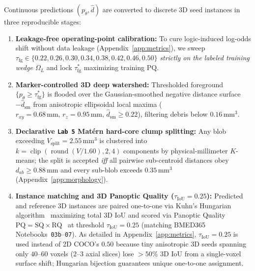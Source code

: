 \documentclass[10pt,a4paper]{article}
\renewcommand{\_}{\origunderscore\allowbreak}
\begin{document}
Continuous predictions $(p_\theta, \hat{d})$ are converted to discrete 3D seed instances in three reproducible stages:
\begin{enumerate}
    \item \textbf{Leakage-free operating-point calibration:} To cure logic-induced log-odds shift without data leakage (Appendix~\ref{app:metrics}), we sweep $\tau_{\text{fg}} \in \{0.22, 0.26, 0.30, 0.34, 0.38, 0.42, 0.46, 0.50\}$ \emph{strictly on the labeled training wedge $\Omega_L$} and lock $\tau_{\text{fg}}^*$ maximizing training $\text{PQ}$.
    \item \textbf{Marker-controlled 3D deep watershed:} Thresholded foreground $\{p_\theta \ge \tau_{\text{fg}}^*\}$ is flooded over the Gaussian-smoothed negative distance surface $-\hat{d}_{\text{sm}}$ from anisotropic ellipsoidal local maxima ($r_{xy} = 0.68\,\text{mm},\, r_z = 0.95\,\text{mm},\, \hat{d}_{\text{sm}} \ge 0.22$), filtering debris below $0.16\,\text{mm}^3$.
    \item \textbf{Declarative \texttt{Lab 5} Mat\'ern hard-core clump splitting:} Any blob exceeding $V_{\text{split}} = 2.55\,\text{mm}^3$ is clustered into $k = \operatorname{clip}(\operatorname{round}(V / 1.60), 2, 4)$ components by physical-millimeter $K$-means; the split is accepted \emph{iff} all pairwise sub-centroid distances obey $d_{ab} \ge 0.88\,\text{mm}$ and every sub-blob exceeds $0.35\,\text{mm}^3$ (Appendix~\ref{app:morphology}).
    \item \textbf{Instance matching and 3D Panoptic Quality ($\tau_{\text{IoU}} = 0.25$):} Predicted and reference 3D instances are paired one-to-one via Kuhn's Hungarian algorithm~\cite{kuhn1955hungarian} maximizing total 3D IoU and scored via Panoptic Quality $\text{PQ} = \text{SQ} \times \text{RQ}$~\cite{kirillov2019panoptic} at threshold $\tau_{\text{IoU}} = 0.25$ (matching BMED365 Notebooks~\texttt{03b}--\texttt{07}). As detailed in Appendix~\ref{app:metrics}, $\tau_{\text{IoU}} = 0.25$ is used instead of 2D COCO's $0.50$ because tiny anisotropic 3D seeds spanning only $40\text{--}60$ voxels ($2\text{--}3$ axial slices) lose $>50\%$ 3D IoU from a single-voxel surface shift; Hungarian bijection guarantees unique one-to-one assignment.
\end{enumerate}
\end{document}
